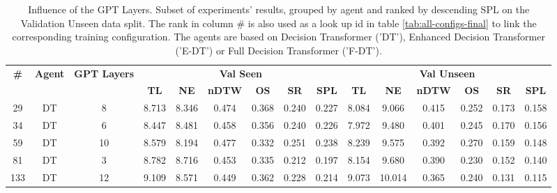 \begin{table}
\centering
\caption{\label{tab:layers}Influence of the GPT Layers. Subset of experiments' results, grouped by agent and ranked by descending SPL on the Validation Unseen data split. The rank in column \# is also used as a look up id in table \ref{tab:all-configs-final} to link the corresponding training configuration.     \newline The agents are based on Decision Transformer ('DT'), Enhanced Decision Transformer ('E-DT') or Full Decision Transformer ('F-DT').}
\begin{tabular}{@{\hskip3pt}c@{\hskip3pt}c@{\hskip3pt}c@{\hskip3pt}c@{\hskip3pt}c@{\hskip3pt}c@{\hskip3pt}c@{\hskip3pt}c@{\hskip3pt}c@{\hskip3pt}c@{\hskip3pt}c@{\hskip3pt}c@{\hskip3pt}c@{\hskip3pt}c@{\hskip3pt}c}
\toprule
\textbf{\#} & \textbf{Agent} & \textbf{GPT Layers} & \multicolumn{6}{c}{\textbf{Val Seen}} & \multicolumn{6}{c}{\textbf{Val Unseen}} \\
\cmidrule(l){4-9} \cmidrule(l){10-15} \textbf{~} &     \textbf{~} &          \textbf{~} &       \textbf{TL} & \textbf{NE} & \textbf{nDTW} & \textbf{OS} & \textbf{SR} & \textbf{SPL} &         \textbf{TL} & \textbf{NE} & \textbf{nDTW} & \textbf{OS} & \textbf{SR} & \textbf{SPL} \\
\midrule
         29 &             DT &                   8 &             8.713 &       8.346 &         0.474 &       0.368 &       0.240 &        0.227 &               8.084 &       9.066 &         0.415 &       0.252 &       0.173 &        0.158 \\
         34 &             DT &                   6 &             8.447 &       8.481 &         0.458 &       0.356 &       0.240 &        0.226 &               7.972 &       9.480 &         0.401 &       0.245 &       0.170 &        0.156 \\
         59 &             DT &                  10 &             8.579 &       8.194 &         0.477 &       0.332 &       0.251 &        0.238 &               8.239 &       9.575 &         0.392 &       0.270 &       0.159 &        0.148 \\
         81 &             DT &                   3 &             8.782 &       8.716 &         0.453 &       0.335 &       0.212 &        0.197 &               8.154 &       9.680 &         0.390 &       0.230 &       0.152 &        0.140 \\
        133 &             DT &                  12 &             9.109 &       8.571 &         0.449 &       0.362 &       0.228 &        0.214 &               9.073 &      10.014 &         0.365 &       0.240 &       0.131 &        0.115 \\

\end{tabular}
\end{table}
